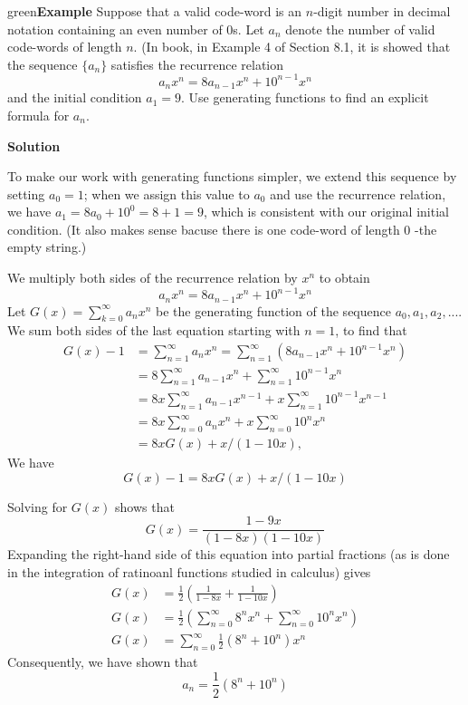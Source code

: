\documentclass[11pt]{article}
\newenvironment{example}[1][\unskip]{\begin{mybox}{green}{\textbf{Example} {#1}}}{\end{mybox}}
\begin{document}
\newpage
\begin{example}
Suppose that a valid code-word is an $n$-digit number in decimal notation containing an even number of 0s. Let $a_n$ denote the number of valid code-words of length $n$. (In book, in Example 4 of Section
8.1, it is showed that the sequence $\{a_n\}$ satisfies the recurrence relation
\begin{equation*}
    a_nx^n = 8 a_{n-1}x^n + 10^{n-1}x^n
\end{equation*}
and the initial condition $a_1 = 9$. Use generating functions to find an explicit formula for $a_n$.

\textbf{Solution}

To make our work with generating functions simpler, we extend this sequence by setting $a_0 = 1$; when we assign this value to $a_0$ and use the recurrence relation, we have $a_1 = 8a_0 + 10^0 = 8 + 1 = 9$, which is consistent with our original initial condition. (It also makes sense bacuse there is one code-word of length 0 -the empty string.)

We multiply both sides of the recurrence relation by $x^n$ to obtain
\begin{equation*}
    a_nx^n = 8 a_{n-1}x^n + 10^{n-1}x^n
\end{equation*}
Let $G(x) = \sum_{k=0}^{\infty} a_nx^n$ be the generating function of the sequence $a_0, a_1, a_2, ...$. We sum both sides of the last equation starting with $n = 1$, to find that
\begin{align*}
    G(x) -1 &= \sum_{n=1}^{\infty} a_nx^n = \sum_{n=1}^{\infty} (8a_{n-1}x^n + 10^{n-1}x^n)\\
    &= 8 \sum_{n=1}^{\infty} a_{n-1}x^n + \sum_{n=1}^{\infty} 10^{n-1}x^n\\
    &= 8x \sum_{n=1}^{\infty} a_{n-1}x^{n-1} + x \sum_{n=1}^{\infty} 10^{n-1}x^{n-1}\\
    &= 8x \sum_{n=0}^{\infty} a_{n}x^{n} + x \sum_{n=0}^{\infty} 10^{n}x^{n}\\
    &= 8xG(x) + x/(1-10x),
\end{align*}
We have
\begin{equation*}
    G(x) - 1 = 8xG(x) + x/(1-10x)
\end{equation*}

Solving for $G(x)$ shows that
\begin{equation*}
    G(x) = \frac{1-9x}{(1-8x)(1-10x)}
\end{equation*}
Expanding the right-hand side of this equation into partial fractions (as is done in the integration of ratinoanl functions studied in calculus) gives
\begin{align*}
    G(x) &= \frac{1}{2} \left( \frac{1}{1-8x} + \frac{1}{1-10x} \right)\\
    G(x) &= \frac{1}{2} \left( \sum_{n=0}^{\infty} 8^nx^n + \sum_{n=0}^{\infty} 10^nx^n \right)\\
    G(x) &= \sum_{n=0}^{\infty} \frac{1}{2} (8^n + 10^n) x^n
\end{align*}
Consequently, we have shown that
\begin{equation*}
    a_n = \frac{1}{2} (8^n + 10^n)
\end{equation*}
\end{example}
\end{document}
